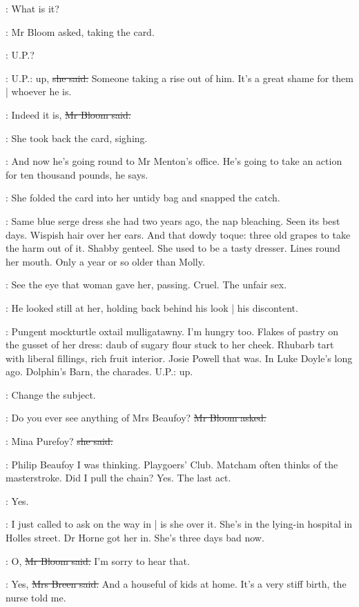 \Bloom:
What is it?

:
Mr Bloom asked,
taking the card.

\Bloom:
U.P.?

\josie:
U.P.: up,
\sout{she said.}
Someone taking a rise out of him.
It's a great shame for them |
whoever he is.

\Bloom:
Indeed it is,
\sout{Mr Bloom said.}

:
She took back the card,
sighing.

\josie:
And now he's going round to Mr Menton's office.
He's going to take an action for ten thousand pounds,
he says.

:
She folded the card into her untidy bag and snapped the catch.

\BloomInt:
Same blue serge dress she had two years ago,
the nap bleaching.
Seen its best days.
Wispish hair over her ears.
And that dowdy toque:
three old grapes to take the harm out of it.
Shabby genteel.
She used to be a tasty dresser.
Lines round her mouth.
Only a year or so older than Molly.

\BloomInt:
See the eye that woman gave her,
passing.
Cruel.
The unfair sex.

:
He looked still at her,
holding back behind his look |
his discontent.

\BloomInt:
Pungent mockturtle oxtail mulligatawny.
I'm hungry too.
Flakes of pastry on the gusset of her dress:
daub of sugary flour stuck to her cheek.
Rhubarb tart with liberal fillings,
rich fruit interior.
Josie Powell that was.
In Luke Doyle's long ago.
Dolphin's Barn,
the charades.
U.P.:
up.

\BloomInt:
Change the subject.

\Bloom:
Do you ever see anything of Mrs Beaufoy?
\sout{Mr Bloom asked.}

\josie:
Mina Purefoy?
\sout{she said.}

\BloomInt:
Philip Beaufoy I was thinking.
Playgoers' Club.
Matcham often thinks of the masterstroke.
Did I pull the chain?
Yes.
The last act.

\Bloom:
Yes.

\josie:
I just called to ask on the way in |
is she over it.
She's in the lying-in hospital in Holles street.
Dr Horne got her in.
She's three days bad now.

\Bloom:
O,
\sout{Mr Bloom said.}
I'm sorry to hear that.

\josie:
Yes,
\sout{Mrs Breen said.}
And a houseful of kids at home.
It's a very stiff birth,
the nurse told me.

